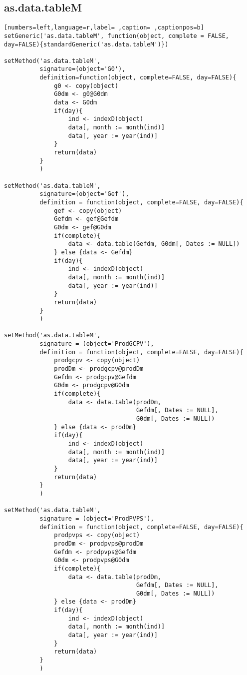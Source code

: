 \subsection{as.data.tableM}
\label{sec:org6d711ac}
\begin{lstlisting}[numbers=left,language=r,label= ,caption= ,captionpos=b]
setGeneric('as.data.tableM', function(object, complete = FALSE, day=FALSE){standardGeneric('as.data.tableM')})

setMethod('as.data.tableM',
          signature=(object='G0'),
          definition=function(object, complete=FALSE, day=FALSE){
              g0 <- copy(object)
              G0dm <- g0@G0dm
              data <- G0dm
              if(day){
                  ind <- indexD(object)
                  data[, month := month(ind)]
                  data[, year := year(ind)]
              }
              return(data)
          }
          )

setMethod('as.data.tableM',
          signature=(object='Gef'),
          definition = function(object, complete=FALSE, day=FALSE){
              gef <- copy(object)
              Gefdm <- gef@Gefdm
              G0dm <- gef@G0dm
              if(complete){
                  data <- data.table(Gefdm, G0dm[, Dates := NULL])
              } else {data <- Gefdm}
              if(day){
                  ind <- indexD(object)
                  data[, month := month(ind)]
                  data[, year := year(ind)]
              }
              return(data)
          }
          )

setMethod('as.data.tableM',
          signature = (object='ProdGCPV'),
          definition = function(object, complete=FALSE, day=FALSE){
              prodgcpv <- copy(object)
              prodDm <- prodgcpv@prodDm
              Gefdm <- prodgcpv@Gefdm
              G0dm <- prodgcpv@G0dm
              if(complete){
                  data <- data.table(prodDm,
                                     Gefdm[, Dates := NULL],
                                     G0dm[, Dates := NULL])
              } else {data <- prodDm}
              if(day){
                  ind <- indexD(object)
                  data[, month := month(ind)]
                  data[, year := year(ind)]
              }
              return(data)
          }
          )

setMethod('as.data.tableM',
          signature = (object='ProdPVPS'),
          definition = function(object, complete=FALSE, day=FALSE){
              prodpvps <- copy(object)
              prodDm <- prodpvps@prodDm
              Gefdm <- prodpvps@Gefdm
              G0dm <- prodpvps@G0dm
              if(complete){
                  data <- data.table(prodDm,
                                     Gefdm[, Dates := NULL],
                                     G0dm[, Dates := NULL])
              } else {data <- prodDm}
              if(day){
                  ind <- indexD(object)
                  data[, month := month(ind)]
                  data[, year := year(ind)]
              }
              return(data)
          }
          )
\end{lstlisting}
